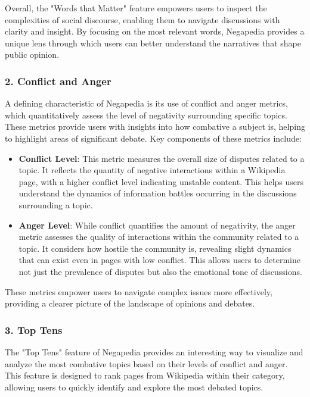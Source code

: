 Overall, the "Words that Matter" feature empowers users to inspect the complexities of social discourse, enabling them to navigate discussions with clarity and insight. By focusing on the most relevant words, Negapedia provides a unique lens through which users can better understand the narratives that shape public opinion.

\subsubsection{2. Conflict and Anger}

A defining characteristic of Negapedia is its use of conflict and anger metrics, which quantitatively assess the level of negativity surrounding specific topics. These metrics provide users with insights into how combative a subject is, helping to highlight areas of significant debate. Key components of these metrics include:

\begin{itemize}
    \item \textbf{Conflict Level}: This metric measures the overall size of disputes related to a topic. It reflects the quantity of negative interactions within a Wikipedia page, with a higher conflict level indicating unstable content. This helps users understand the dynamics of information battles occurring in the discussions surrounding a topic.
    \item \textbf{Anger Level}: While conflict quantifies the amount of negativity, the anger metric assesses the quality of interactions within the community related to a topic. It considers how hostile the community is, revealing slight dynamics that can exist even in pages with low conflict. This allows users to determine not just the prevalence of disputes but also the emotional tone of discussions.
\end{itemize}

These metrics empower users to navigate complex issues more effectively, providing a clearer picture of the landscape of opinions and debates.

\subsubsection{3. Top Tens}

The "Top Tens" feature of Negapedia provides an interesting way to visualize and analyze the most combative topics based on their levels of conflict and anger. This feature is designed to rank pages from Wikipedia within their category, allowing users to quickly identify and explore the most debated topics.

